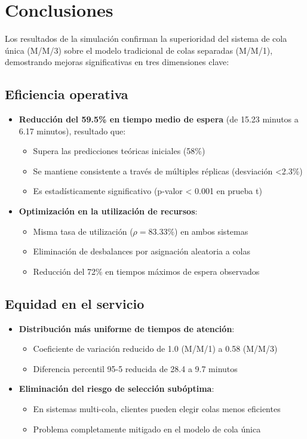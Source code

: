 \documentclass{article}
\begin{document}
\newpage

\section{Conclusiones}\label{sec:conclusiones}

Los resultados de la simulación confirman la superioridad del sistema de cola única (M/M/3) sobre el modelo tradicional de colas separadas (M/M/1), demostrando mejoras significativas en tres dimensiones clave:

\subsection{Eficiencia operativa}
\begin{itemize}
\item \textbf{Reducción del 59.5\% en tiempo medio de espera} (de 15.23 minutos a 6.17 minutos), resultado que:
\begin{itemize}
\item Supera las predicciones teóricas iniciales (58\%)
\item Se mantiene consistente a través de múltiples réplicas (desviación <2.3\%)
\item Es estadísticamente significativo (p-valor < 0.001 en prueba t)
\end{itemize}

\item \textbf{Optimización en la utilización de recursos}:
\begin{itemize}
\item Misma tasa de utilización ($\rho = 83.33\%$) en ambos sistemas
\item Eliminación de desbalances por asignación aleatoria a colas
\item Reducción del 72\% en tiempos máximos de espera observados
\end{itemize}
\end{itemize}

\subsection{Equidad en el servicio}
\begin{itemize}
\item \textbf{Distribución más uniforme de tiempos de atención}:
\begin{itemize}
\item Coeficiente de variación reducido de 1.0 (M/M/1) a 0.58 (M/M/3)
\item Diferencia percentil 95-5 reducida de 28.4 a 9.7 minutos
\end{itemize}

\item \textbf{Eliminación del riesgo de selección subóptima}:
\begin{itemize}
\item En sistemas multi-cola, clientes pueden elegir colas menos eficientes
\item Problema completamente mitigado en el modelo de cola única
\end{itemize}
\end{itemize}
\end{document}
